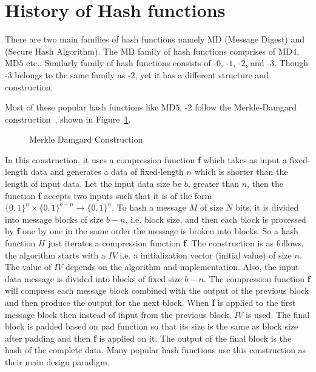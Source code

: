 \section{History of Hash functions}

There are two main families of hash functions namely MD (Message Digest) and \SHA (Secure Hash Algorithm). The MD family of hash functions comprises of MD$4$, MD$5$ etc.. Similarly \SHA{} family of hash functions consists of \SHA-$0$, \SHA-$1$, \SHA-$2$, and \SHA-$3$.
Though \SHA-$3$ belongs to the same family as \SHA-$2$, yet it has a different structure and construction.

Most of these popular hash functions like MD$5$, \SHA-$2$ follow the Merkle-Damgard construction~\cite{merkle}, shown in Figure~\ref{MDConstruction}.
%
\begin{figure}
    \centering
    \caption{Merkle Damgard Construction~\cite{MDamgard}}
    \label{MDConstruction}
\end{figure}
%
%
In this construction, it uses a compression function \textbf{f} which takes as input a fixed-length data and generates a data of fixed-length $n$ which is shorter than the length of input data. Let the input data size be $b$, greater than $n$, then the function \textbf{f} accepts two inputs such that it is of the form $\big\{0,1\big\}^n \times \big\{0,1\big\}^{b - n} \rightarrow \big\{0,1\big\}^n$. To hash a message $M$ of size $N$ bits, it is divided into message blocks of size $b-n$, i.e. block size, and then each block is processed by \textbf{f} one by one in the same order the message is broken into blocks. So a hash function $H$ just iterates a compression function \textbf{f}. The construction is as follows, the algorithm starts with a $IV$ i.e. a initialization vector (initial value) of size $n$. The value of $IV$ depends on the algorithm and implementation. Also, the input data message is divided into blocks of fixed size $b-n$. The compression function \textbf{f} will compress each message block combined with the output of the previous block and then produce the output for the next block. When \textbf{f} is applied to the first message block then instead of input from the previous block, $IV$ is used. The final block is padded based on pad function so that its size is the same as block size after padding and then \textbf{f} is applied on it. The output of the final block is the hash of the complete data. Many popular hash functions use this construction as their main design paradigm. 

